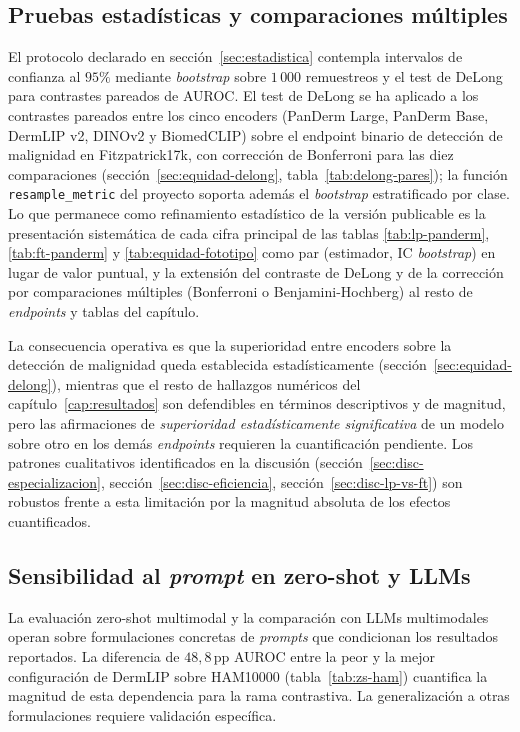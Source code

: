 \subsection{Pruebas estadísticas y comparaciones múltiples}
\label{sec:lim-estadistica}

El protocolo declarado en sección~\ref{sec:estadistica} contempla
intervalos de confianza al $95\%$ mediante \emph{bootstrap} sobre
$1\,000$ remuestreos y el test de DeLong~\cite{delong1988} para
contrastes pareados de AUROC. El test de DeLong se ha aplicado a los
contrastes pareados entre los cinco encoders (PanDerm Large, PanDerm
Base, DermLIP v2, DINOv2 y BiomedCLIP) sobre el endpoint binario de
detección de malignidad en Fitzpatrick17k, con corrección de
Bonferroni para las diez comparaciones
(sección~\ref{sec:equidad-delong},
tabla~\ref{tab:delong-pares}); la función \texttt{resample\_metric}
del proyecto soporta además el \emph{bootstrap} estratificado por
clase. Lo que permanece como refinamiento estadístico de la versión
publicable es la presentación sistemática de cada cifra principal de
las tablas \ref{tab:lp-panderm}, \ref{tab:ft-panderm} y
\ref{tab:equidad-fototipo} como par (estimador, IC \emph{bootstrap})
en lugar de valor puntual, y la extensión del contraste de DeLong y
de la corrección por comparaciones múltiples (Bonferroni o
Benjamini-Hochberg) al resto de \emph{endpoints} y tablas del
capítulo.

La consecuencia operativa es que la superioridad entre encoders
sobre la detección de malignidad queda establecida estadísticamente
(sección~\ref{sec:equidad-delong}), mientras que el resto de
hallazgos numéricos del capítulo~\ref{cap:resultados} son
defendibles en términos descriptivos y de magnitud, pero las
afirmaciones de \emph{superioridad estadísticamente significativa}
de un modelo sobre otro en los demás \emph{endpoints} requieren la
cuantificación pendiente. Los patrones
cualitativos identificados en la discusión
(sección~\ref{sec:disc-especializacion}, sección~\ref{sec:disc-eficiencia},
sección~\ref{sec:disc-lp-vs-ft}) son robustos frente a esta limitación
por la magnitud absoluta de los efectos cuantificados.

\subsection{Sensibilidad al \emph{prompt} en zero-shot y LLMs}
\label{sec:lim-prompts}

La evaluación zero-shot multimodal y la comparación con LLMs
multimodales operan sobre formulaciones concretas de \emph{prompts}
que condicionan los resultados reportados. La diferencia de
$48{,}8$\,pp AUROC entre la peor y la mejor configuración de
DermLIP sobre HAM10000 (tabla~\ref{tab:zs-ham}) cuantifica la
magnitud de esta dependencia para la rama contrastiva. La
generalización a otras formulaciones requiere validación
específica.

